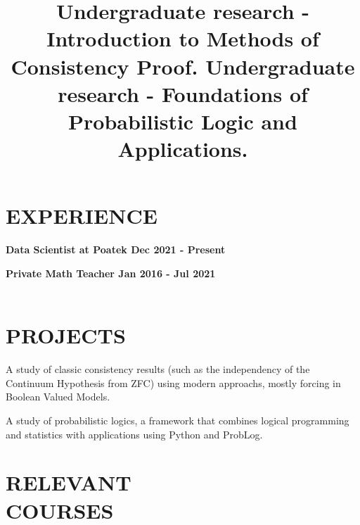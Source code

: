 \documentclass[margin]{res}
\begin{document}
\begin{resume}
\section{EXPERIENCE}

\textbf{Data Scientist at Poatek \hfill{Dec 2021 - Present}\\}

\textbf{Private Math Teacher \hfill{Jan 2016 - Jul 2021}\\}
 \\



\section{PROJECTS}
\title{\textbf{Undergraduate research - Introduction to Methods of Consistency Proof. }}

\begin{position}
    A study of classic consistency results (such as the independency of the Continuum Hypothesis from ZFC) using modern approachs, mostly forcing in Boolean Valued Models. 
\end{position}

\title{\textbf{Undergraduate research - Foundations of Probabilistic Logic and Applications.}}

\begin{position}
    A study of probabilistic logics, a framework that combines logical programming and statistics with applications using Python and ProbLog. 
\end{position}

\section{RELEVANT\\COURSES}
\par






\end{resume}
\end{document}
